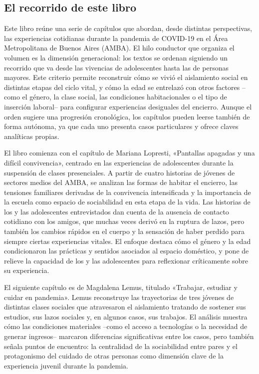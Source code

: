 \begin{refsection}
\section[El recorrido de este libro]{El recorrido de este libro}
\label{cap-21.el-recorrido-de-este-libro}
Este libro reúne una serie de capítulos que abordan, desde distintas perspectivas, las experiencias cotidianas durante la pandemia de COVID-19 en el Área Metropolitana de Buenos Aires (AMBA). El hilo conductor que organiza el volumen es la dimensión generacional: los textos se ordenan siguiendo un recorrido que va desde las vivencias de adolescentes hasta las de personas mayores. Este criterio permite reconstruir cómo se vivió el aislamiento social en distintas etapas del ciclo vital, y cómo la edad se entrelazó con otros factores –como el género, la clase social, las condiciones habitacionales o el tipo de inserción laboral– para configurar experiencias desiguales del encierro. Aunque el orden sugiere una progresión cronológica, los capítulos pueden leerse también de forma autónoma, ya que cada uno presenta casos particulares y ofrece claves analíticas propias.

El libro comienza con el capítulo de Mariana Lopresti, «Pantallas apagadas y una difícil convivencia», centrado en las experiencias de adolescentes durante la suspensión de clases presenciales. A partir de cuatro historias de jóvenes de sectores medios del AMBA, se analizan las formas de habitar el encierro, las tensiones familiares derivadas de la convivencia intensificada y la importancia de la escuela como espacio de sociabilidad en esta etapa de la vida. Las historias de los y las adolescentes entrevistados dan cuenta de la ausencia de contacto cotidiano con los amigos, que muchas veces derivó en la ruptura de lazos, pero también los cambios rápidos en el cuerpo y la sensación de haber perdido para siempre ciertas experiencias vitales. El enfoque destaca cómo el género y la edad condicionaron las prácticas y sentidos asociados al espacio doméstico, y pone de relieve la capacidad de los y las adolescentes para reflexionar críticamente sobre su experiencia.

El siguiente capítulo es de Magdalena Lemus, titulado «Trabajar, estudiar y cuidar en pandemia». Lemus reconstruye las trayectorias de tres jóvenes de distintas clases sociales que atravesaron el aislamiento tratando de sostener sus estudios, sus lazos sociales y, en algunos casos, sus trabajos. El análisis muestra cómo las condiciones materiales –como el acceso a tecnologías o la necesidad de generar ingresos– marcaron diferencias significativas entre los casos, pero también señala puntos de encuentro: la centralidad de la sociabilidad entre pares y el protagonismo del cuidado de otras personas como dimensión clave de la experiencia juvenil durante la pandemia.


\end{refsection}
